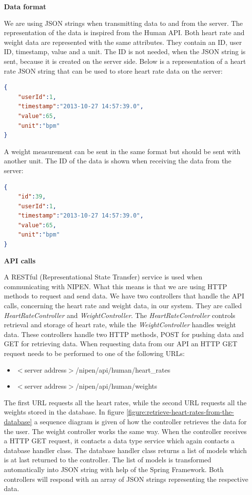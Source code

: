 \textbf{Data format}

We are using JSON strings when transmitting data to and from the server.
The representation of the data is inspired from the Human API.
Both heart rate and weight data are represented with the same attributes.
They contain an ID, user ID, timestamp, value and a unit.
The ID is not needed, when the JSON string is sent, because it is created on the server side.
Below is a representation of a heart rate JSON string that can be used to store heart rate data on the server:

\begin{lstlisting}[language=json]
{
    "userId":1,
    "timestamp":"2013-10-27 14:57:39.0",
    "value":65,
    "unit":"bpm"
}
\end{lstlisting}

A weight measurement can be sent in the same format but should be sent with another unit.
The ID of the data is shown when receiving the data from the server:

\begin{lstlisting}[language=json]
{
    "id":39,
    "userId":1,
    "timestamp":"2013-10-27 14:57:39.0",
    "value":65,
    "unit":"bpm"
}
\end{lstlisting} 

\textbf{API calls}

A RESTful (Representational State Transfer) service is used when communicating with NIPEN.
What this means is that we are using HTTP methods to request and send data.
We have two controllers that handle the API calls, concerning the heart rate and weight data, in our system.
They are called \textit{HeartRateController} and \textit{WeightController}. 
The \textit{HeartRateController} controls retrieval and storage of heart rate, while the \textit{WeightController} handles weight data.
These controllers handle two HTTP methods, POST for pushing data and GET for retrieving data.
When requesting data from our API an HTTP GET request needs to be performed to one of the following URLs:

\begin{itemize}
\item $<$server address$>$/nipen/api/human/heart\_rates
\item $<$server address$>$/nipen/api/human/weights
\end{itemize}

The first URL requests all the heart rates, while the second URL requests all the weights stored in the database.
In figure \ref{figure:retrieve-heart-rates-from-the-database} a sequence diagram is given of how the controller retrieves the data for the user.
The weight controller works the same way.
When the controller receives a HTTP GET request, it contacts a data type service which again contacts a database handler class.
The database handler class returns a list of models which is at last returned to the controller.
The list of models is transformed automatically into JSON string with help of the Spring Framework.
Both controllers will respond with an array of JSON strings representing the respective data.


